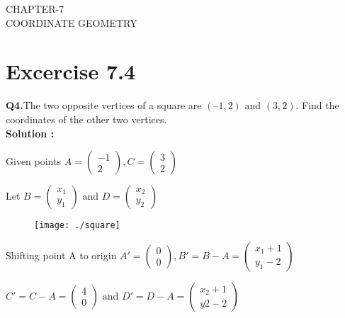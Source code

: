 \documentclass[12pt]{article}
\begin{document}
\begin{center}
\textbf\large{CHAPTER-7 \\ COORDINATE GEOMETRY}

\end{center}
\section*{Excercise 7.4}

\textbf{Q4.}The two opposite vertices of a square are $(–1, 2) \text{ and } (3, 2)$. Find the coordinates of the other two vertices.\\
\textbf{Solution :}

Given points $A =
\begin{pmatrix}
-1 \\
 2
\end{pmatrix},
C = 
\begin{pmatrix}
3\\
2
\end{pmatrix}$

Let $B = \begin{pmatrix}
x_{1}\\
y_{1}
\end{pmatrix} \text{ and }D = \begin{pmatrix}
x_{2}\\
y_{2}
\end{pmatrix} $
\begin{figure}[!h]
	\begin{center} 
	    \texttt{[image: ./square]}
	\end{center}
\caption{}
\label{fig:Fig1}
\end{figure}

Shifting point A to origin
$A' =
\begin{pmatrix}
0 \\
 0
\end{pmatrix}, 
B' = B-A = \begin{pmatrix}
x_{1}+1 \\
y_{1}-2 
\end{pmatrix}$

$C' = C-A = 
\begin{pmatrix}
4 \\
 0
\end{pmatrix} \text{ and } 
D' = D-A = 
\begin{pmatrix}
x_{2}+1 \\
y{2}-2
\end{pmatrix}$
\end{document}

